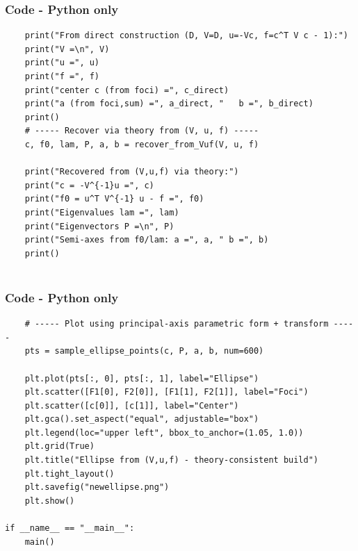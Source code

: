 \documentclass{beamer}
\theoremstyle{remark}
\numberwithin{equation}{section}
\begin{document}
\begin{frame}[fragile]
\frametitle{Code - Python only}
\begin{lstlisting}
    print("From direct construction (D, V=D, u=-Vc, f=c^T V c - 1):")
    print("V =\n", V)
    print("u =", u)
    print("f =", f)
    print("center c (from foci) =", c_direct)
    print("a (from foci,sum) =", a_direct, "   b =", b_direct)
    print()
    # ----- Recover via theory from (V, u, f) -----
    c, f0, lam, P, a, b = recover_from_Vuf(V, u, f)

    print("Recovered from (V,u,f) via theory:")
    print("c = -V^{-1}u =", c)
    print("f0 = u^T V^{-1} u - f =", f0)
    print("Eigenvalues lam =", lam)
    print("Eigenvectors P =\n", P)
    print("Semi-axes from f0/lam: a =", a, " b =", b)
    print()


\end{lstlisting}
\end{frame}

\begin{frame}[fragile]
\frametitle{Code - Python only}
\begin{lstlisting}
    # ----- Plot using principal-axis parametric form + transform -----
    pts = sample_ellipse_points(c, P, a, b, num=600)

    plt.plot(pts[:, 0], pts[:, 1], label="Ellipse")
    plt.scatter([F1[0], F2[0]], [F1[1], F2[1]], label="Foci")
    plt.scatter([c[0]], [c[1]], label="Center")
    plt.gca().set_aspect("equal", adjustable="box")
    plt.legend(loc="upper left", bbox_to_anchor=(1.05, 1.0))
    plt.grid(True)
    plt.title("Ellipse from (V,u,f) - theory-consistent build")
    plt.tight_layout()
    plt.savefig("newellipse.png")
    plt.show()

if __name__ == "__main__":
    main()


\end{lstlisting}
\end{frame}
\end{document}
